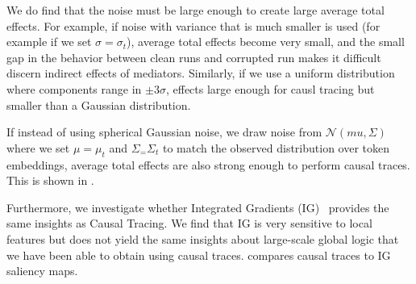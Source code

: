 We do find that the noise must be large enough to create large average total effects.  For example, if noise with variance that is much smaller is used (for example if we set $\sigma=\sigma_t$), average total effects become very small, and the small gap in the behavior between clean runs and corrupted run makes it difficult discern indirect effects of mediators. Similarly, if we use a uniform distribution where components range in $\pm 3\sigma$, effects large enough for causl tracing but smaller than a Gaussian distribution.

If instead of using spherical Gaussian noise, we draw noise from $\mathcal{N}(mu, \Sigma)$ where we set $\mu = \mu_t$ and $\Sigma_ = \Sigma_t$ to match the observed distribution over token embeddings, average total effects are also strong enough to perform causal traces.  This is shown in .

Furthermore, we investigate whether Integrated Gradients (IG)~\citep{sundararajan2017axiomatic} provides the same insights as Causal Tracing.  We find that IG is very sensitive to local features but does not yield the same insights about large-scale global logic that we have been able to obtain using causal traces.  compares causal traces to IG saliency maps.








